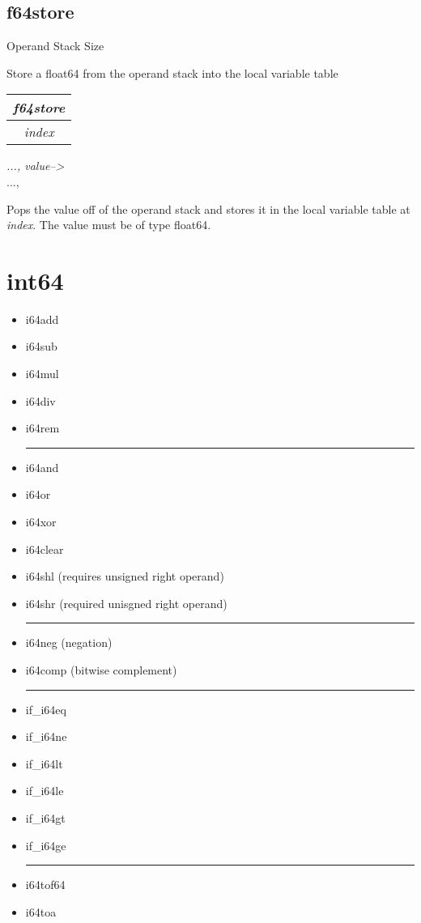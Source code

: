 \documentclass[12pt]{article}
\begin{document}
		\subsection*{f64store}
			\begin{labeling}{Operand Stack Size}
				\item [\textbf{Operation}] Store a float64 from the operand stack into the local variable table
				\item [\textbf{Format}] \begin{tabular}{| c |} \hline \textit{f64store} \\ \hline \textit{index} \\ \hline \end{tabular}
				\item [\textbf{Operand Stack}] \textit{..., value--\textgreater } \\
										{..., }
				\item [\textbf{Description}] Pops the value off of the operand stack and stores it in the local variable table at \textit{index}. The value must be of type float64. 
			\end{labeling}
		\newpage 

	\section{int64}
		\begin{itemize}
			\item i64add
			\item i64sub
			\item i64mul
			\item i64div
			\item i64rem
			\\ \hrule
			\item i64and
			\item i64or
			\item i64xor
			\item i64clear
			\item i64shl (requires unsigned right operand)
			\item i64shr (required unisgned right operand)
			\\ \hrule
			\item i64neg (negation)
			\item i64comp (bitwise complement)
			\\ \hrule
			\item if\_i64eq
			\item if\_i64ne
			\item if\_i64lt
			\item if\_i64le
			\item if\_i64gt
			\item if\_i64ge
			\\ \hrule
			\item i64tof64
			\item i64toa
		\end{itemize}
		\newpage
\end{document}
